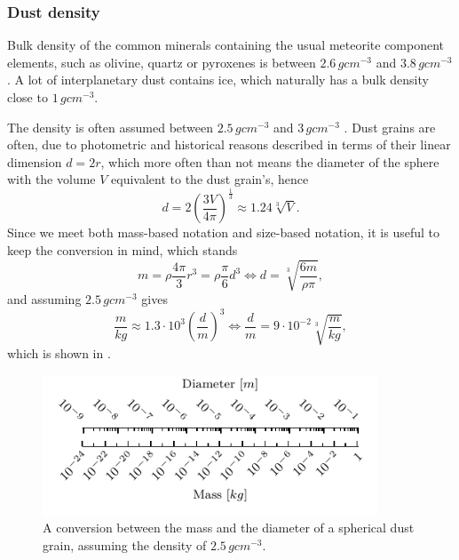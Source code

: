 \subsubsection{Dust density} \label{sec:density}

Bulk density of the common minerals containing the usual meteorite component elements, such as olivine, quartz or pyroxenes is between $2.6 \, \si{g cm^{-3}}$ and $3.8 \, \si{g cm^{-3}}$ \citep{duda1986minerals}. A lot of interplanetary dust contains ice, which naturally has a bulk density close to $1 \, \si{g cm^{-3}}$.

The density is often assumed between $2.5 \, \si{g cm^{-3}}$ \citep{mann2014dust} and $3 \, \si{g cm^{-3}}$ \citep{mcdonnell1984cosmic}. Dust grains are often, due to photometric and historical reasons described in terms of their linear dimension $d = 2r$, which more often than not means the diameter of the sphere with the volume $V$ equivalent to the dust grain's, hence
\begin{equation}
    d = 2 \left( {\frac{3V}{4\pi}} \right)^{\frac{1}{3}} \approx 1.24 \sqrt[3]{V}.
\end{equation}
Since we meet both mass-based notation and size-based notation, it is useful to keep the conversion in mind, which stands
\begin{equation}
    m = \rho \frac{4\pi}{3} r^3 = \rho \frac{\pi}{6} d^3 \Leftrightarrow d = \sqrt[3]{\frac{6 m}{\rho \pi}},
    \label{eq:density}
\end{equation}
and assuming $2.5 \, \si{g cm^{-3}}$ gives
\begin{equation}
    \frac{m}{\si{kg}} \approx 1.3 \cdot 10^3 \left(\frac{d}{\si{m}}\right)^3 
\Leftrightarrow 
    \frac{d}{\si{m}} = 9 \cdot 10^{-2} \sqrt[3]{\frac{m}{\si{kg}}},
\end{equation}
which is shown in .

\begin{figure}[h]
 	\centering
 	\includegraphics[width=10cm]{figures/mass_size_ruler.pdf}
 	\caption{A conversion between the mass and the diameter of a spherical dust grain, assuming the density of $2.5 \, \si{g cm^{-3}}$.}
 	\label{fig:mass_size_ruler}
\end{figure}


